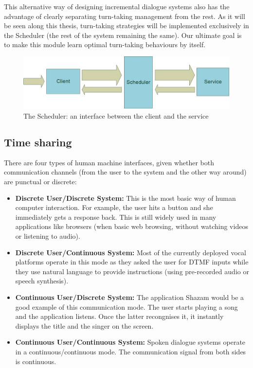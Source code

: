         This alternative way of designing incremental dialogue systems also has the advantage of clearly separating turn-taking management from the rest. As it will be seen along this thesis, turn-taking strategies will be implemented exclusively in the Scheduler (the rest of the system remaining the same). Our ultimate goal is to make this module learn optimal turn-taking behaviours by itself.
        
     	\begin{figure}[t]
          \centering
          \includegraphics[scale=0.4]{figures/ClientSchedService.jpg}
          \caption{The Scheduler: an interface between the client and the service}
          \label{fig:archioverview}
        \end{figure}
        
    \subsection{Time sharing}
    
    	There are four types of human machine interfaces, given whether both communication channels (from the user to the system and the other way around) are punctual or discrete:
        
        \begin{itemize}
        	\item \textbf{Discrete User/Discrete System:} This is the most basic way of human computer interaction. For example, the user hits a button and she immediately gets a response back. This is still widely used in many applications like browsers (when basic web browsing, without watching videos or listening to audio).
            \item \textbf{Discrete User/Continuous System:} Most of the currently deployed vocal platforms operate in this mode as they asked the user for DTMF inputs while they use natural language to provide instructions (using pre-recorded audio or speech synthesis).
           	\item \textbf{Continuous User/Discrete System:} The application Shazam would be a good example of this communication mode. The user starts playing a song and the application listens. Once the latter recongnises it, it instantly displays the title and the singer on the screen.
            \item \textbf{Continuous User/Continuous System:} Spoken dialogue systems operate in a continuous/continuous mode. The communication signal from both sides is continuous.
        \end{itemize}
        
